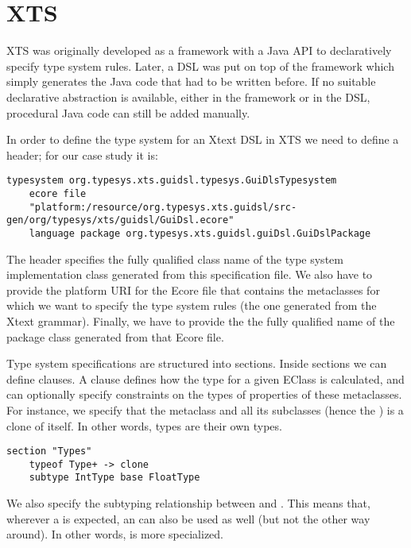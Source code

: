 \section{XTS}
\label{sec:xts}

XTS was originally developed as a framework with a Java API to declaratively
specify type system rules. Later, a DSL was put on top of the framework which
simply generates the Java code that had to be written before.
If no suitable declarative abstraction is available, either in the framework or
in the DSL, procedural Java code can still be added manually.

In order to define the type system for an Xtext DSL in XTS we need to define a
header; for our case study it is:

\begin{lstlisting}[language=xts] 
typesystem org.typesys.xts.guidsl.typesys.GuiDlsTypesystem 
    ecore file 
    "platform:/resource/org.typesys.xts.guidsl/src-gen/org/typesys/xts/guidsl/GuiDsl.ecore"
    language package org.typesys.xts.guidsl.guiDsl.GuiDslPackage 
\end{lstlisting}

The header specifies the fully qualified class name of the type system
implementation class generated from this specification file. We also have to
provide the platform URI for the Ecore file that contains the metaclasses for
which we want to specify the type system rules (the one generated from the Xtext
grammar). Finally, we have to provide the the fully qualified name of the
package class generated from that Ecore file.

Type system specifications  are structured into sections. Inside sections we can define 
clauses. A  clause defines how the type for a given EClass is
calculated, and can optionally specify constraints on the types of properties of
these metaclasses.
For instance, we specify that
the  metaclass and all its subclasses (hence the \ic{+}) is a clone of itself.
In other words, types are their own types.

\begin{lstlisting}[language=xts] 
section "Types"
    typeof Type+ -> clone
    subtype IntType base FloatType
\end{lstlisting}

We also specify the subtyping relationship between  and . This
means that, wherever a  is expected, an  can also be
used as well (but not the other way around). In other words,  is
more specialized.

